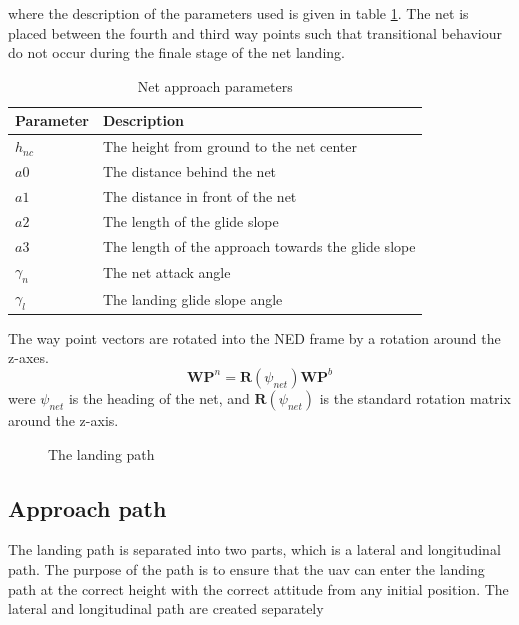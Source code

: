 where the description of the parameters used is given in table \ref{Tb:Approach Parameters}. The net is placed between the fourth and third way points such that transitional behaviour do not occur during the finale stage of the net landing.
\begin{table}[H]
\begin{center}
    \begin{tabular}{ | l | l |}
    \hline
    \textbf{Parameter} & \textbf{Description} \\ \hline
    $h_{nc}$ & The height from ground to the net center \\ \hline
    $a0$ & The distance behind the net \\ \hline
    $a1$ & The distance in front of the net \\ \hline
    $a2$ & The length of the glide slope \\ \hline
    $a3$ & The length of the approach towards the glide slope \\ \hline
    $\gamma_n$ & The net attack angle \\ \hline
    $\gamma_l$ & The landing glide slope angle \\ \hline
    \end{tabular}
\end{center}
\caption{Net approach parameters }
\label{Tb:Approach Parameters}
\end{table}
The way point vectors are rotated into the NED frame by a rotation around the z-axes.
\begin{equation}
\mathbf{WP}^n = \mathbf{R}(\psi_{net})\mathbf{WP}^b
\end{equation}
were $\psi_{net}$ is the heading of the net, and $\mathbf{R}(\psi_{net})$ is the standard rotation matrix around the z-axis.
\begin{figure}
\def\svgwidth{\textwidth} %

\caption{The landing path}
\label{Fig:LandingPhase}
\end{figure}

\subsection{Approach path}\label{SS:LandingApproach}
The landing path is separated into two parts, which is a lateral and longitudinal path. The purpose of the path is to ensure that the \gls{uav} can enter the landing path at the correct height with the correct attitude from any initial position. The lateral and longitudinal path are created separately 
